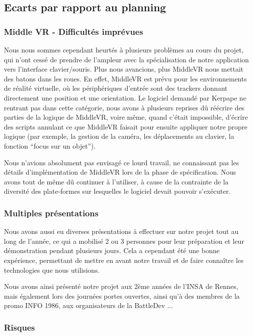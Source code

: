 \subsection{Ecarts par rapport au planning}


\subsubsection{Middle VR - Difficultés imprévues}
Nous nous sommes cependant heurtés à plusieurs problèmes au cours du projet, qui n'ont cessé de prendre de l'ampleur
avec la spécialisation de notre application vers l'interface clavier/souris. Plus nous avancions, plus MiddleVR
nous mettait des batons dans les roues. En effet, MiddleVR est prévu pour les environnements de réalité virtuelle,
où les périphériques d'entrée sont des trackers donnant directement une position et une orientation. Le logiciel
demandé par Kerpape ne rentrant pas dans cette catégorie, nous avons à plusieurs reprises dû réécrire des parties de la
logique de MiddleVR, voire même, quand c'était impossible, d'écrire des scripts annulant ce que MiddleVR faisait pour
ensuite appliquer notre propre logique (par exemple, la gestion de la caméra, les déplacements au clavier, la fonction
\enquote{focus sur un objet}).

Nous n'avions absolument pas envisagé ce lourd travail, ne connaissant pas les détails d'implémentation de MiddleVR
lors de la phase de spécification. Nous avons tout de même dû continuer à l'utiliser, à cause de la contrainte de la
diversité des plate-formes sur lesquelles le logiciel devait pouvoir s'exécuter.

\subsubsection{Multiples présentations}

Nous avons aussi eu diverses présentations à effectuer sur notre projet tout au long de l'année, ce qui a mobilisé
2 ou 3 personnes pour leur préparation et leur démonstration pendant plusieurs jours. Cela a cependant été une
bonne expérience, permettant de mettre en avant notre travail et de faire connaître les technologies que nous
utilisions.

Nous avons ainsi présenté notre projet aux 2ème années de l'INSA de Rennes, mais également lors des journées portes ouvertes, ainsi qu'à des membres de la promo INFO 1986, aux organisateurs de la BattleDev ...

\subsubsection{Risques}

